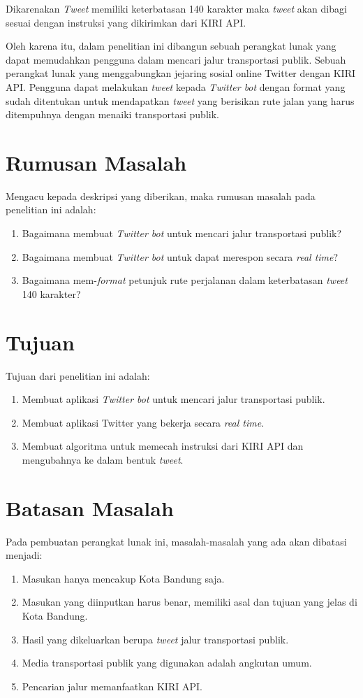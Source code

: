 Dikarenakan \textit{Tweet} memiliki keterbatasan 140 karakter maka \textit{tweet} akan dibagi sesuai dengan instruksi yang dikirimkan dari KIRI API.

Oleh karena itu, dalam penelitian ini dibangun sebuah perangkat lunak yang dapat memudahkan pengguna dalam mencari jalur transportasi publik. Sebuah perangkat lunak yang menggabungkan jejaring sosial online Twitter dengan KIRI API. Pengguna dapat melakukan \textit{tweet} kepada \textit{Twitter bot} dengan format yang sudah ditentukan untuk mendapatkan \textit{tweet} yang berisikan rute jalan yang harus ditempuhnya dengan menaiki transportasi publik.

\section{Rumusan Masalah}
Mengacu kepada deskripsi yang diberikan, maka rumusan masalah pada penelitian ini adalah:
\begin{enumerate}
	\item Bagaimana membuat \textit{Twitter bot} untuk mencari jalur transportasi publik?
	\item Bagaimana membuat \textit{Twitter bot} untuk dapat merespon secara \textit{real time}?
	\item Bagaimana mem-\textit{format} petunjuk rute perjalanan dalam keterbatasan \textit{tweet} 140 karakter?
\end{enumerate}

\section{Tujuan}
Tujuan dari penelitian ini adalah:
\begin{enumerate}
	\item Membuat aplikasi \textit{Twitter bot} untuk mencari jalur transportasi publik.
	\item Membuat aplikasi Twitter yang bekerja secara \textit{real time}.
	\item Membuat algoritma untuk memecah instruksi dari KIRI API dan mengubahnya ke dalam bentuk \textit{tweet}.
\end{enumerate}

\section{Batasan Masalah}
Pada pembuatan perangkat lunak ini, masalah-masalah yang ada akan dibatasi menjadi:
\begin{enumerate}
	\item Masukan hanya mencakup Kota Bandung saja.
	\item Masukan yang diinputkan harus benar, memiliki asal dan tujuan yang jelas di Kota Bandung.
	\item Hasil yang dikeluarkan berupa \textit{tweet} jalur transportasi publik.
	\item Media transportasi publik yang digunakan adalah angkutan umum.
	\item Pencarian jalur memanfaatkan KIRI API.
\end{enumerate}

